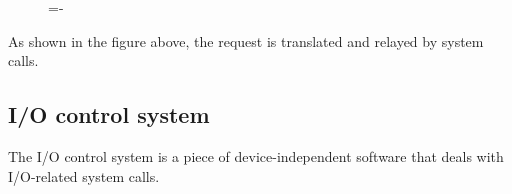 \documentclass[a4paper]{systems-software}
\begin{document}
\begin{figure}[H]
  \lineskip=-\fboxrule
\end{figure}

As shown in the figure above, the request is translated and relayed by system calls.


\subsection*{I/O control system}

The I/O control system is a piece of device-independent software that deals with I/O-related system calls.
\end{document}
